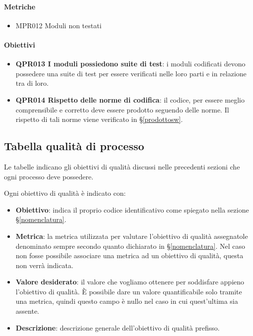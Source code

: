         \paragraph*{Metriche}
        \begin{itemize}
            \item MPR012 Moduli non testati
        \end{itemize}
    
        \paragraph*{Obiettivi}
        \begin{itemize}
            \item \textbf{QPR013 I moduli possiedono suite di test}: i moduli codificati devono possedere una suite di test per essere verificati nelle loro parti e in relazione tra di loro.
            \item \textbf{QPR014 Rispetto delle norme di codifica}: il codice, per essere meglio comprensibile e corretto deve essere prodotto seguendo delle norme. Il rispetto di tali norme viene verificato in \S\ref{prodottosw}.
        \end{itemize}

\subsection{Tabella qualità di processo}
Le tabelle indicano gli obiettivi di qualità discussi nelle precedenti sezioni che ogni processo deve possedere.

Ogni obiettivo di qualità è indicato con:

\begin{itemize}
	\item \textbf{Obiettivo}: indica il proprio codice identificativo come spiegato nella sezione \S\ref{nomenclatura}.
	\item \textbf{Metrica}: la metrica utilizzata per valutare l'obiettivo di qualità assegnatole denominato sempre secondo quanto dichiarato in \S\ref{nomenclatura}. Nel caso non fosse possibile associare una metrica ad un obiettivo di qualità, questa non verrà indicata.
	\item \textbf{Valore desiderato}: il valore che vogliamo ottenere per soddisfare appieno l'obiettivo di qualità. È possibile dare un valore quantificabile solo tramite una metrica, quindi questo campo è nullo nel caso in cui quest'ultima sia assente.
	\item \textbf{Descrizione}: descrizione generale dell'obiettivo di qualità prefisso.
\end{itemize}

